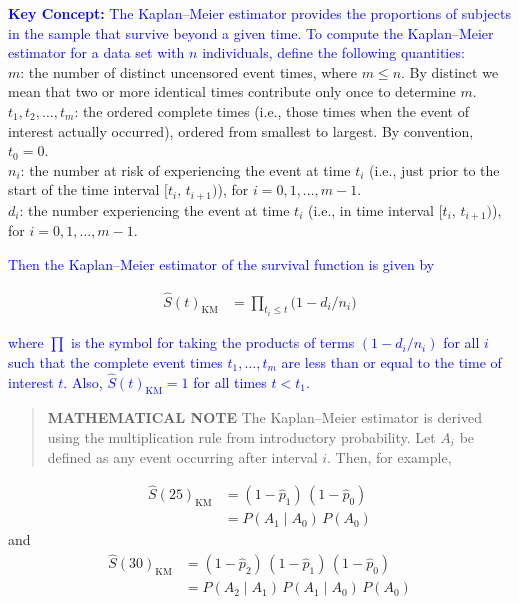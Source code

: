 \documentclass[
]{book}
\begin{document}
\textbf{\textcolor{blue}{Key Concept:}}
\textcolor{blue}{The Kaplan–Meier estimator provides the proportions of subjects in the sample that survive beyond a given time. To compute the Kaplan–Meier estimator for a data set with $n$ individuals, define the following quantities:}\\
\(m\): the number of distinct uncensored event times, where \(m \le n\). By distinct we mean that two or more identical times contribute only once to determine \(m\).\\
\(t_1, t_2, \dots, t_m\): the ordered complete times (i.e., those times when the event of interest actually occurred), ordered from smallest to largest. By convention, \(t_0 = 0\).\\
\(n_i\): the number at risk of experiencing the event at time \(t_i\) (i.e., just prior to the start of the time interval \([t_i,\,t_{i+1})\)), for \(i = 0,1,\dots,m-1\).\\
\(d_i\): the number experiencing the event at time \(t_i\) (i.e., in time interval \([t_i,\,t_{i+1})\)), for \(i = 0,1,\dots,m-1\).

\textcolor{blue}{Then the Kaplan–Meier estimator of the survival function is given by}

\begin{align}\label{9.2}
\hat S(t)_{\mathrm{KM}} &= \prod_{t_i \le t} \bigl(1 - d_i/n_i\bigr)
\tag{9.2}
\end{align}

\textcolor{blue}{where $\prod$ is the symbol for taking the products of terms $(1 - d_i/n_i)$ for all $i$ such that the complete event times $t_1,\dots,t_m$ are less than or equal to the time of interest $t$. Also, $\hat S(t)_{\mathrm{KM}} = 1$ for all times $t < t_1$.}

\begin{quote}
\textbf{MATHEMATICAL NOTE} The Kaplan--Meier estimator is derived using the multiplication rule from introductory probability. Let \(A_i\) be defined as any event occurring after interval \(i\). Then, for example,
\end{quote}

\begin{align}
\hat S(25)_{\mathrm{KM}} &= (1 - \hat p_1)\,(1 - \hat p_0) \\
&= P(A_1 \mid A_0)\,P(A_0)
\end{align}
and
\begin{align}
\hat S(30)_{\mathrm{KM}} &= (1 - \hat p_2)\,(1 - \hat p_1)\,(1 - \hat p_0) \\
&= P(A_2 \mid A_1)\,P(A_1 \mid A_0)\,P(A_0)
\end{align}
\end{document}

